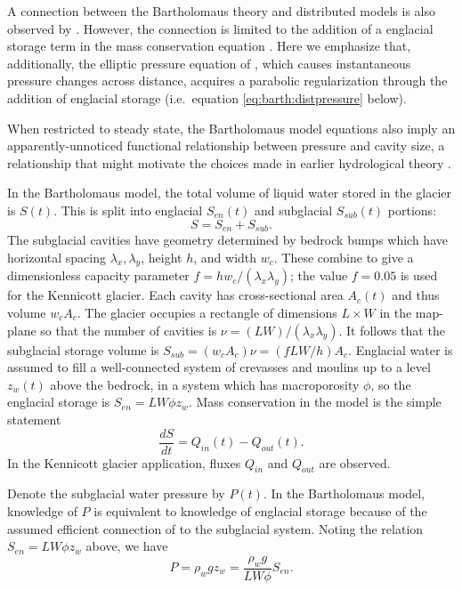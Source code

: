 \documentclass[twocolumn,letterpaper]{igs}
\begin{document}
A connection between the Bartholomaus theory and distributed models is also observed by \cite{Hewitt2013}.  However, the connection is limited to the addition of a englacial storage term in the mass conservation equation \cite[equation (7)]{Hewitt2013}.  Here we emphasize that, additionally, the elliptic pressure equation of \cite{Schoofetal2012}, which causes instantaneous pressure changes across distance, acquires a parabolic regularization through the addition of englacial storage (i.e.~equation \eqref{eq:barth:distpressure} below).

When restricted to steady state, the Bartholomaus model equations also imply an apparently-unnoticed functional relationship between pressure and cavity size, a relationship that might motivate the choices made in earlier hydrological theory \citep{FlowersClarke2002_theory}.
 
In the Bartholomaus model, the total volume of liquid water stored in the glacier is $S(t)$.  This is split into englacial $S_{en}(t)$ and subglacial $S_{sub}(t)$ portions:
\begin{equation}
S = S_{en} + S_{sub}.  \label{eq:barth:kinematics}
\end{equation}
The subglacial cavities have geometry determined by bedrock bumps which have horizontal spacing $\lambda_x,\lambda_y$, height $h$, and width $w_c$.  These combine to give a dimensionless capacity parameter $f=h w_c/(\lambda_x \lambda_y)$; the value $f=0.05$ is used for the Kennicott glacier.  Each cavity has cross-sectional area $A_c(t)$ and thus volume $w_c A_c$.  The glacier occupies a rectangle of dimensions $L\times W$ in the map-plane so that the number of cavities is $\nu = (LW)/(\lambda_x\lambda_y)$.  It follows that the subglacial storage volume is $S_{sub} = (w_c A_c) \nu = (f L W/h) A_c$.  Englacial water is assumed to fill a well-connected system of crevasses and moulins up to a level $z_w(t)$ above the bedrock, in a system which has macroporosity $\phi$, so the englacial storage is $S_{en}=L W \phi z_w$.  Mass conservation in the model is the simple statement \citep{Bartholomausetal2008}
\begin{equation}
\frac{dS}{dt} = Q_{in}(t) - Q_{out}(t). \label{eq:barth:massconserve}
\end{equation}
In the Kennicott glacier application, fluxes $Q_{in}$ and $Q_{out}$ are observed.

Denote the subglacial water pressure by $P(t)$.  In the Bartholomaus model, knowledge of $P$ is equivalent to knowledge of englacial storage because of the assumed efficient connection of to the subglacial system.  Noting the relation $S_{en}=L W \phi z_w$ above, we have
\begin{equation}
P = \rho_w g z_w = \frac{\rho_w g}{LW\phi} S_{en}.  \label{eq:barth:englacialpressure}
\end{equation}
\end{document}
